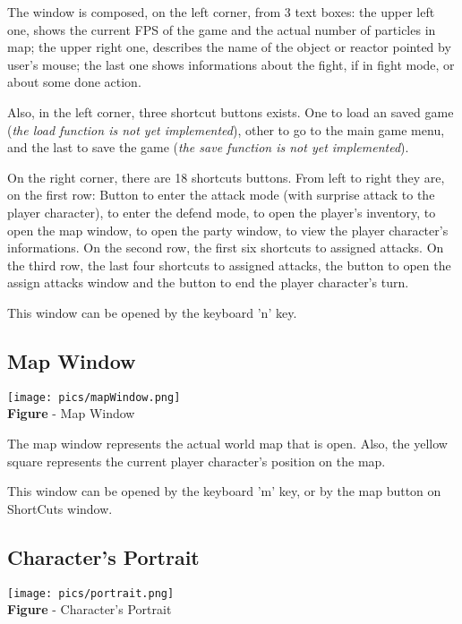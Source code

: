 \documentclass[ letterpaper,12pt]{article}
\begin{document}
The window is composed, on the left corner, from 3 text boxes: the upper left
one, shows the current FPS of the game and the actual number of particles in
map; the upper right one, describes the name of the object or reactor pointed
by user's mouse; the last one shows informations about the fight, if in fight
mode, or about some done action.

Also, in the left corner, three shortcut buttons exists. One to load an saved
game ({\it the load function is not yet implemented}), other to go to the main
game menu, and the last to save the game ({\it the save function is not yet
implemented}).

On the right corner, there are 18 shortcuts buttons. From left to right they
are, on the first row: Button to enter the attack mode (with surprise attack to
the player character), to enter the defend mode, to open the player's
inventory, to open the map window, to open the party window, to view the player
character's informations. On the second row, the first six shortcuts to
assigned attacks. On the third row, the last four shortcuts to assigned
attacks, the button to open the assign attacks window and the button to end the
player character's turn.

This window can be opened by the keyboard 'n' key.

\subsection{Map Window}

\begin{center}
  \texttt{[image: pics/mapWindow.png]}
\\{\bf Figure} - Map Window
\end{center}

The map window represents the actual world map that is open. Also, the yellow square represents the current player character's position on the map. 

This window can be opened by the keyboard 'm' key, or by the map button on ShortCuts window.

\subsection{Character's Portrait}

\begin{center}
  \texttt{[image: pics/portrait.png]}
\\{\bf Figure} - Character's Portrait
\end{center}
\end{document}
